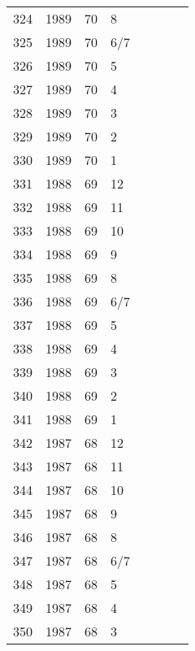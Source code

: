 \begin{longtable}{ |l|l|l|l|l|l|l|l| }
324 & 1989 & 70 &     8 &         &                &  & \\
325 & 1989 & 70 &   6/7 &         &                &  & \\
326 & 1989 & 70 &     5 &         &                &  & \\
327 & 1989 & 70 &     4 &         &                &  & \\
328 & 1989 & 70 &     3 &         &                &  & \\
329 & 1989 & 70 &     2 &         &                &  & \\
330 & 1989 & 70 &     1 &         &                &  & \\
331 & 1988 & 69 &    12 &         &                &  & \\
332 & 1988 & 69 &    11 &         &                &  & \\
333 & 1988 & 69 &    10 &         &                &  & \\
334 & 1988 & 69 &     9 &         &                &  & \\
335 & 1988 & 69 &     8 &         &                &  & \\
336 & 1988 & 69 &   6/7 &         &                &  & \\
337 & 1988 & 69 &     5 &         &                &  & \\
338 & 1988 & 69 &     4 &         &                &  & \\
339 & 1988 & 69 &     3 &         &                &  & \\
340 & 1988 & 69 &     2 &         &                &  & \\
341 & 1988 & 69 &     1 &         &                &  & \\
342 & 1987 & 68 &    12 &         &                &  & \\
343 & 1987 & 68 &    11 &         &                &  & \\
344 & 1987 & 68 &    10 &         &                &  & \\
345 & 1987 & 68 &     9 &         &                &  & \\
346 & 1987 & 68 &     8 &         &                &  & \\
347 & 1987 & 68 &   6/7 &         &                &  & \\
348 & 1987 & 68 &     5 &         &                &  & \\
349 & 1987 & 68 &     4 &         &                &  & \\
350 & 1987 & 68 &     3 &         &                &  & \\

\end{longtable}
